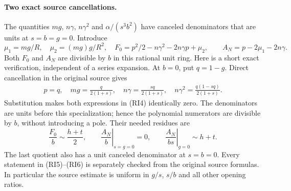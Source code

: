 \paragraph{Two exact source cancellations.}
The quantities $mg$, $n\gamma$, $n\gamma^2$ and
$\alpha/(s^3b^2)$ have canceled denominators that are units at
$s=b=g=0$. Introduce
\[
 \mu_1=mg/R,\quad \mu_2=(mg)g/R^2,\quad
 F_0=p^2/2-n\gamma^2-2n\gamma p+\mu_2,\qquad
 A_N=p-2\mu_1-2n\gamma.
 \tag{RI4}
\]
Both $F_0$ and $A_N$ are divisible by $b$ in this rational unit ring.
Here is a short exact verification, independent of a series expansion.
At $b=0$, put $q=1-g$. Direct cancellation in the original source gives
\[
 \begin{gathered}
 p=q,\quad mg=\frac{q}{2(1+s)},\quad
 n\gamma=\frac{sq}{2(1+s)},\quad
 n\gamma^2=\frac{q(1-sq)}{2(1+s)}.
 \end{gathered}                                                    \tag{RI5}
\]
Substitution makes both expressions in (RI4) identically zero.
The denominators are units before this specialization; hence the
polynomial numerators are divisible by $b$, without introducing a
pole. Their needed residues are
\[
 \frac{F_0}{b}\sim\frac{h+t}{2},\qquad
 \left.\frac{A_N}{b}\right|_{s=g=0}=0,\qquad
 \left.\frac{A_N}{bs}\right|_{g=0}\sim h+t.
 \tag{RI6}
\]
The last quotient also has a unit canceled denominator at $s=b=0$.
Every statement in (RI5)--(RI6) is separately checked from the original
source formulas. In particular the source estimate is uniform in
$g/s$, $s/b$ and all other opening ratios.

